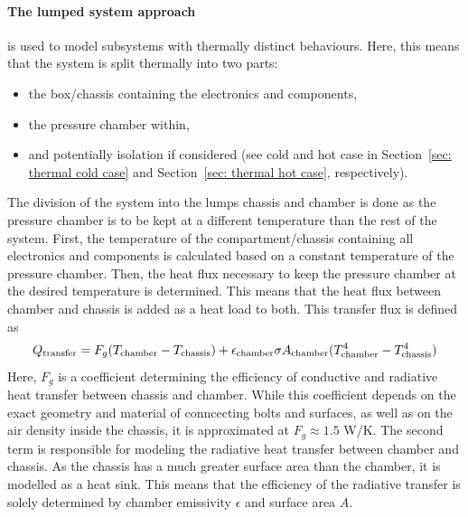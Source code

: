 \documentclass[
  a4paper,
  11pt,
  openany,
  parskip,
  toc=totoc,
  listof=totoc,
  bibliography=totoc
]{scrreprt}
\newcommand{\sref}[1]{Section~\ref{#1}}
\let\qty\relax
\newcommand{\qty}[1]{\left( #1 \right)}
\begin{document}
\paragraph{The lumped system approach} is used to model subsystems with thermally distinct behaviours. Here, this means that the system is split thermally into two parts: 
\begin{itemize}
    \item the box/chassis containing the electronics and components, 
    \item the pressure chamber within,
    \item and potentially isolation if considered (see cold and hot case in \sref{sec: thermal cold case} and \sref{sec: thermal hot case}, respectively).
\end{itemize}
The division of the system into the lumps chassis and chamber is done as the pressure chamber is to be kept at a different temperature than the rest of the system. First, the temperature of the compartment/chassis containing all electronics and components is calculated based on a constant temperature of the pressure chamber. Then, the heat flux necessary to keep the pressure chamber at the desired temperature is determined. This means that the heat flux between chamber and chassis is added as a heat load to both. 
This transfer flux is defined as 
\begin{align}
    Q_\mathrm{transfer} = F_g (T_\mathrm{chamber}-T_\mathrm{chassis}) + \epsilon_\mathrm{chamber}\sigma A_\mathrm{chamber}\qty(T_\mathrm{chamber}^4-T_\mathrm{chassis}^4)
\end{align}
Here, $F_g$ is a coefficient determining the efficiency of conductive and radiative heat transfer between chassis and chamber. While this coefficient depends on the exact geometry and material of conncecting bolts and surfaces, as well as on the air density inside the chassis, it is approximated at $F_g\approx 1.5$ W/K. The second term is responsible for modeling the radiative heat transfer between chamber and chassis. As the chassis has a much greater surface area than the chamber, it is modelled as a heat sink. This means that the efficiency of the radiative transfer is solely determined by chamber emissivity $\epsilon$ and surface area $A$.
\end{document}
